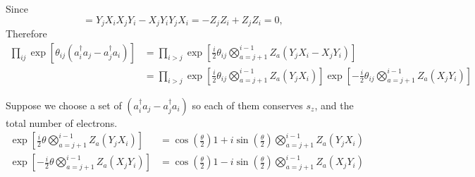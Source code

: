 \documentclass[11pt, oneside]{article}   	%
\begin{document}
Since 
\begin{equation}
[Y_j X_i, X_j Y_i] = Y_j X_i X_j Y_i - X_j Y_i Y_j X_i = - Z_j Z_i + Z_j Z_i  = 0,
\end{equation}
Therefore
\begin{align}
\prod_{ij} \exp \left[ \theta_{ij} (a^{\dagger}_i a_j - a^{\dagger}_j a_i) \right] 
&= \prod_{i > j} \exp \left[ \frac{i}{2} \theta_{ij} \bigotimes^{i-1}_{a=j+1} Z_a  (Y_j X_i - X_j Y_i) \right] \\
&= \prod_{i>j} 
\exp \left[ \frac{i}{2} \theta_{ij} \bigotimes^{i-1}_{a=j+1} Z_a  (Y_j X_i) \right] 
\exp \left[ - \frac{i}{2} \theta_{ij} \bigotimes^{i-1}_{a=j+1} Z_a  (X_j Y_i) \right]
\end{align}

Suppose we choose a set of $(a^{\dagger}_i a_j - a^{\dagger}_j a_i)$ so each of them conserves $s_z$, and the total number of electrons.
\begin{align}
\exp \left[ \frac{i}{2} \theta \bigotimes^{i-1}_{a=j+1} Z_a  (Y_j X_i) \right] 
&= \cos \left( \frac{\theta}{2} \right) 1 + i \sin \left( \frac{\theta}{2} \right) \bigotimes^{i-1}_{a=j+1} Z_a  (Y_j X_i) \\
\exp \left[ - \frac{i}{2} \theta \bigotimes^{i-1}_{a=j+1} Z_a  (X_j Y_i) \right]
&= \cos \left( \frac{\theta}{2} \right) 1 - i \sin \left( \frac{\theta}{2} \right) \bigotimes^{i-1}_{a=j+1} Z_a  (X_j Y_i)
\end{align}
\end{document}
